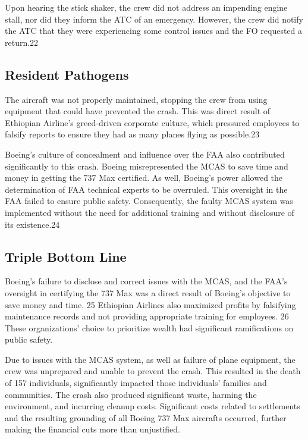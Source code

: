 \documentclass[
  10pt,
  promotesection,
  endnotes,
  draft,
]{memreport}
\begin{document}
  Upon hearing the stick shaker, the crew did not address an impending engine stall, nor did they inform the ATC of an emergency. However, the crew did notify the ATC that they were experiencing some control issues and the FO requested a return.22
  \subsection{Resident Pathogens}
  The aircraft was not properly maintained, stopping the crew from using equipment that could have prevented the crash. This was direct result of Ethiopian Airline's greed-driven corporate culture, which pressured employees to falsify reports to ensure they had as many planes flying as possible.23

  Boeing's culture of concealment and influence over the FAA also contributed significantly to this crash. Boeing misrepresented the MCAS to save time and money in getting the 737 Max certified. As well, Boeing's power allowed the determination of FAA technical experts to be overruled. This oversight in the FAA failed to ensure public safety. Consequently, the faulty MCAS system was implemented without the need for additional training and without disclosure of its existence.24
  \subsection{Triple Bottom Line}
  Boeing's failure to disclose and correct issues with the MCAS, and the FAA's oversight in certifying the 737 Max was a direct result of Boeing's objective to save money and time. 25 Ethiopian Airlines also maximized profits by falsifying maintenance records and not providing appropriate training for employees. 26 These organizations' choice to prioritize wealth had significant ramifications on public safety.

  Due to issues with the MCAS system, as well as failure of plane equipment, the crew was unprepared and unable to prevent the crash. This resulted in the death of 157 individuals, significantly impacted those individuals' families and communities. The crash also produced significant waste, harming the environment, and incurring cleanup costs. Significant costs related to settlements and the resulting grounding of all Boeing 737 Max aircrafts occurred, further making the financial cuts more than unjustified.
\end{document}
